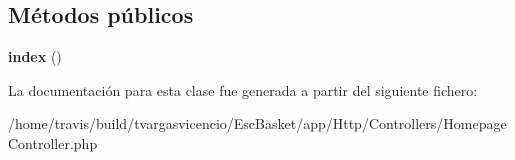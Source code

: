 \subsection*{\-Métodos públicos}
\begin{DoxyCompactItemize}
\item 
\hypertarget{class_app_1_1_http_1_1_controllers_1_1_homepage_controller_ac50e04c7dc943a572077b4768e1f8a43}{{\bfseries index} ()}\label{class_app_1_1_http_1_1_controllers_1_1_homepage_controller_ac50e04c7dc943a572077b4768e1f8a43}

\end{DoxyCompactItemize}


\-La documentación para esta clase fue generada a partir del siguiente fichero\-:\begin{DoxyCompactItemize}
\item 
/home/travis/build/tvargasvicencio/\-Esc\-Basket/app/\-Http/\-Controllers/\-Homepage\-Controller.\-php\end{DoxyCompactItemize}
